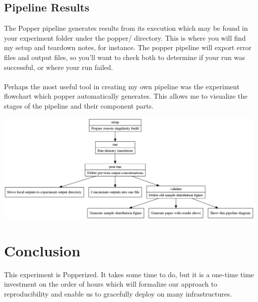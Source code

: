 \documentclass[12pt]{article}
\begin{document}
\subsection*{Pipeline Results}
The Popper pipeline generates results from its execution which may be found in your experiment folder under the popper/ directory. This is where you will find my setup and teardown notes, for instance. The popper pipeline will export error files and output files, so you'll want to check both to determine if your run was successful, or where your run failed.

\paragraph{}
Perhaps the most useful tool in creating my own pipeline was the experiment flowchart which popper automatically generates. This allows me to visualize the stages of the pipeline and their component parts.
\begin{center}
\includegraphics[scale=0.2]{../../wf.png}
\end{center}

\section*{Conclusion}
This experiment is Popperized. It takes some time to do, but it is a one-time time investment on the order of hours which will formalize our approach to reproducibility and enable us to gracefully deploy on many infrastructures.
\end{document}
